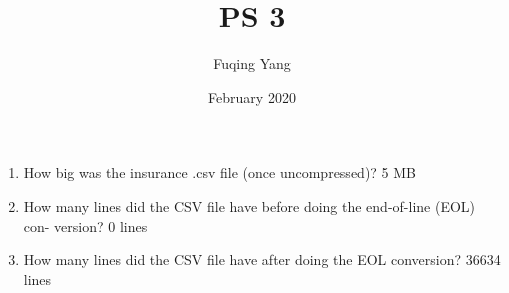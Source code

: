 \documentclass{article}
\title{PS 3}
\author{Fuqing Yang}
\date{February 2020}
\begin{document}
\maketitle



\begin{enumerate}
\item  How big was the insurance .csv file (once uncompressed)? 
5 MB
\item How many lines did the CSV file have before doing the end-of-line (EOL) con- version?
 0 lines
\item  How many lines did the CSV file have after doing the EOL conversion?  36634 lines

\end{enumerate}
\end{document}

